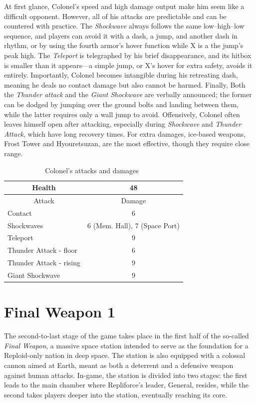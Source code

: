 At first glance, Colonel’s speed and high damage output make him seem like a difficult opponent. However, all of his attacks are predictable and can be countered with practice. The \emph{Shockwave} always follows the same low–high–low sequence, and players can avoid it with a dash, a jump, and another dash in rhythm, or by using the fourth armor's hover function while X is a the jump's peak high. The \emph{Teleport} is telegraphed by his brief disappearance, and its hitbox is smaller than it appears—a simple jump, or X’s hover for extra safety, avoids it entirely. Importantly, Colonel becomes intangible during his retreating dash, meaning he deals no contact damage but also cannot be harmed. Finally, Both the \emph{Thunder attack} and the \emph{Giant Shockwave} are verbally announced; the former can be dodged by jumping over the ground bolts and landing between them, while the latter requires only a wall jump to avoid. Offensively, Colonel often leaves himself open after attacking, especially during \emph{Shockwave} and \emph{Thunder Attack}, which have long recovery times. For extra damages, ice-based weapons, Frost Tower and Hyouretsuzan, are the most effective, though they require close range. 

\begin{table}[htp]
	\centering
	\begin{tabular}[h]{l c}
		\toprule
		\multicolumn{1}{c}{Health}  & 48\\
		\midrule
		\multicolumn{1}{c}{Attack} & \multicolumn{1}{c}{Damage}\\
		Contact & 6 \\
		Shockwaves & 6 (Mem. Hall), 7 (Space Port) \\
		Teleport & 9\\
		Thunder Attack - floor & 6\\
		Thunder Attack - rising & 9\\
		Giant Shockwave & 9\\
		\bottomrule
	\end{tabular}
	\caption{Colonel's attacks and damages~\cite{book:Compendium,wiki:Colonel}}
\end{table}

\section{Final Weapon 1}
The second-to-last stage of the game takes place in the first half of the so-called \textit{Final Weapon}, a massive space station intended to serve as the foundation for a Reploid-only nation in deep space. The station is also equipped with a colossal cannon aimed at Earth, meant as both a deterrent and a defensive weapon against human attacks. In-game, the station is divided into two stages: the first leads to the main chamber where Repliforce’s leader, General, resides, while the second takes players deeper into the station, eventually reaching its core.

